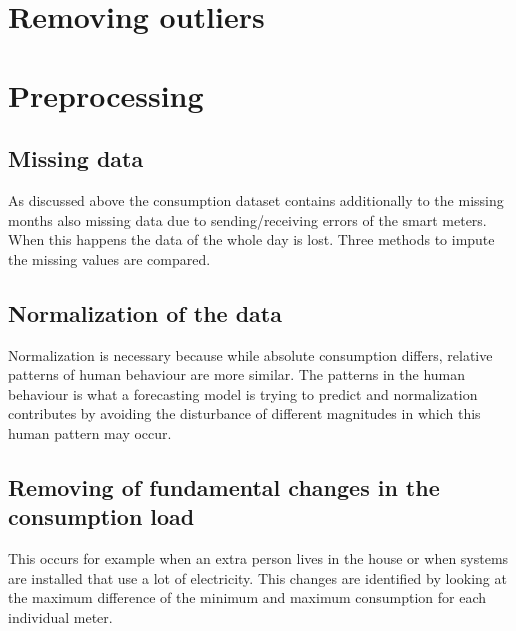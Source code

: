 \section{Removing outliers}

\section{Preprocessing}
\subsection{Missing data} \label{s:missing_data}
As discussed above the consumption dataset contains additionally to the missing months also missing data due to sending/receiving errors of the smart meters. When this happens the data of the whole day is lost. Three methods to impute the missing values are compared. 


\subsection{Normalization of the data}
Normalization is necessary because while absolute consumption differs, relative patterns of human behaviour are more similar.\cite{Lago2020} The patterns in the human behaviour is what a forecasting model is trying to predict and normalization contributes by avoiding the disturbance of different magnitudes in which this human pattern may occur.  

\subsection{Removing of fundamental changes in the consumption load}  
This occurs for example when an extra person lives in the house or when systems are installed that use a lot of electricity.
This changes are identified by looking at the maximum difference of the minimum and maximum consumption for each individual meter.




